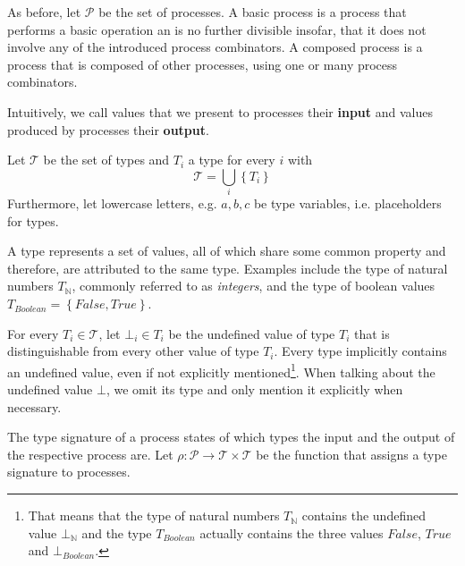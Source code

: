 As before, let $\mathcal{P}$ be the set of processes. A basic process is a process that performs a basic operation an is no further divisible insofar, that it does not involve any of the introduced process combinators. A composed process is a process that is composed of other processes, using one or many process combinators.

Intuitively, we call values that we present to processes their \textbf{input} and values produced by processes their \textbf{output}.

\begin{definition}
Let $\mathcal{T}$ be the set of types and $T_i$ a type for every $i$ with
\begin{equation*}
  \mathcal{T} = \bigcup_i \left\{ T_i \right\}
\end{equation*}
Furthermore, let lowercase letters, e.g. $a, b, c$ be type variables, i.e. placeholders for types.

\hfill\qedsymbol
\end{definition}

A type represents a set of values, all of which share some common property and therefore, are attributed to the same type. Examples include the type of natural numbers $T_\mathbb{N}$, commonly referred to as \textit{integers}, and the type of boolean values $T_{Boolean} = \left\{False, True \right\}$.

\begin{definition}
For every $T_i \in \mathcal{T}$, let $\bot_i \in T_i$ be the undefined value of type $T_i$ that is distinguishable from every other value of type $T_i$. Every type implicitly contains an undefined value, even if not explicitly mentioned\footnote{That means that the type of natural numbers $T_\mathbb{N}$ contains the undefined value $\bot_\mathbb{N}$ and the type $T_{Boolean}$ actually contains the three values $False$, $True$ and $\bot_{Boolean}$.}. When talking about the undefined value $\bot$, we omit its type and only mention it explicitly when necessary.

\hfill\qedsymbol
\end{definition}


\begin{definition}
\label{def:type_signature}
The type signature of a process states of which types the input and the output of the respective process are. Let $\rho \colon \mathcal{P} \to \mathcal{T} \times \mathcal{T}$ be the function that assigns a type signature to processes.

\hfill\qedsymbol
\end{definition}


